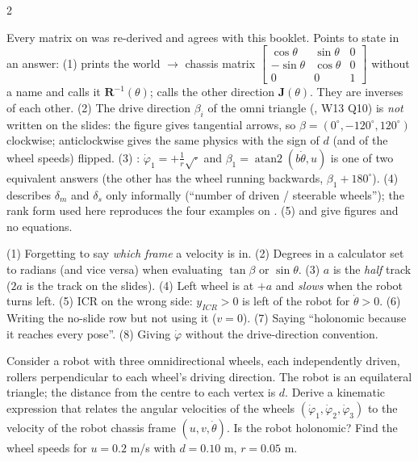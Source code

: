 \begin{multicols}{2}
\begin{slideerr}
Every matrix on  was re-derived and agrees with this booklet. Points to state in an answer: (1)  prints the world $\to$ chassis matrix $\begin{bmatrix}\cos\theta&\sin\theta&0\\-\sin\theta&\cos\theta&0\\0&0&1\end{bmatrix}$ without a name and  calls it $\mathbf R^{-1}(\theta)$;  calls the other direction $\mathbf J(\theta)$. They are inverses of each other. (2) The drive direction $\beta_i$ of the omni triangle (, W13 Q10) is \emph{not} written on the slides: the figure gives tangential arrows, so $\beta=(0^\circ,-120^\circ,120^\circ)$ clockwise; anticlockwise gives the same physics with the sign of $d$ (and of the wheel speeds) flipped. (3) : $\dot\varphi_1=+\frac1r\sqrt{\cdot}$ and $\beta_1=\operatorname{atan2}(b\dot\theta,u)$ is one of two equivalent answers (the other has the wheel running backwards, $\beta_1+180^\circ$). (4)  describes $\delta_m$ and $\delta_s$ only informally (``number of driven / steerable wheels''); the rank form used here reproduces the four examples on . (5)  and  give figures and no equations.
\end{slideerr}
\begin{trap}
(1) Forgetting to say \emph{which frame} a velocity is in. (2) Degrees in a calculator set to radians (and vice versa) when evaluating $\tan\beta$ or $\sin\theta$. (3) $a$ is the \emph{half} track ($2a$ is the track on the slides). (4) Left wheel is at $+a$ and \emph{slows} when the robot turns left. (5) ICR on the wrong side: $y_{ICR}>0$ is left of the robot for $\dot\theta>0$. (6) Writing the no-slide row but not using it ($v=0$). (7) Saying ``holonomic because it reaches every pose''. (8) Giving $\dot\varphi$ without the drive-direction convention.
\end{trap}
\newpage
{}
\begin{examq}
Consider a robot with three omnidirectional wheels, each independently driven, rollers perpendicular to each wheel's driving direction. The robot is an equilateral triangle; the distance from the centre to each vertex is $d$. Derive a kinematic expression that relates the angular velocities of the wheels $(\dot\varphi_1,\dot\varphi_2,\dot\varphi_3)$ to the velocity of the robot chassis frame $(u,v,\dot\theta)$. Is the robot holonomic? Find the wheel speeds for $u=0.2$ m/s with $d=0.10$ m, $r=0.05$ m.

\end{examq}
\end{multicols}

